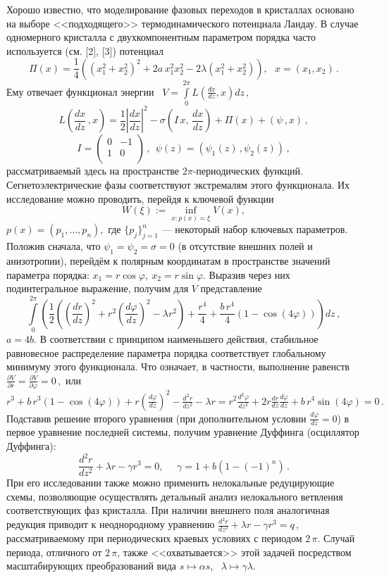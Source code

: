 Хорошо известно, что моделирование фазовых переходов в кристаллах
основано на выборе <<подходящего>> термодинамического потенциала
Ландау. В случае одномерного кристалла с двухкомпонентным параметром
порядка часто используется (см. [2], [3]) потенциал
 $$
\Pi(x) = \frac14 \left((x_1^2+x_2^2)^2+ 2a\,x_1^2x_2^2 -
2\lambda(x_1^2+x_2^2)\right), \ \ \  x =(x_1,x_2)\,.
 $$
Ему отвечает функционал энергии  \ $V =
\int\limits_0^{2\pi}L(\frac{d x}{d z},x)dz\,,$
 $$
L\left(\frac{d x}{d z}\,,x\right) = \frac12 \left|\frac{d x}{d
z}\right|^2- \sigma\left(I\,x,\,\frac{d x}{d z}\right) + \Pi(x) +
(\psi\,, x)\,,
 $$
 $$
I= \left(
    \begin{array}{cc}
    0 &- 1\\
   1 &  0\\
    \end{array}
    \right)\,,
\ \ \psi(z) =(\psi_1(z)\,, \psi_2(z))\,,
 $$
рассматриваемый здесь на пространстве $2\pi$-периодических функций.
Сегнетоэлектрические фазы соответствуют экстремалям этого
функционала. Их исследование можно проводить, перейдя к ключевой
функции
 $$
W(\xi):=\inf_{x:p(x)=\xi} V(x),
 $$
$p(x)=(p_1,\dots,p_n),$ где $\{p_j\}_{j=1}^n$ --- некоторый набор
ключевых параметров. Положив сначала, что $\psi_1 = \psi_2 =\sigma =
0$ (в отсутствие внешних полей и анизотропии), перейдём к полярным
координатам в пространстве значений параметра порядка:
 $
x_1=r\cos\varphi,\ x_2=r\sin\varphi.
 $
Выразив через них подинтегральное выражение, получим для $V$
представление
 {\footnotesize
 $$
\int\limits_0^{2\pi} \left(\frac12\left(\left(\frac{d r}{d
z}\right)^2 + r^2\left(\frac{d \varphi}{d z}\right)^2-\lambda r^2
\right) + \frac{r^4}4 +\frac{b\,r^4}4(1-\cos( 4\varphi))\right)dz\,,
 $$}
$a=4b$. В соответствии с принципом наименьшего действия, стабильное
равновесное распределение параметра порядка соответствует
глобальному минимуму этого функ\-ци\-о\-на\-ла. Что означает, в
частности, выполнение равенств
 $
\frac{\partial V}{\partial r}= \frac{\partial V}{\partial \varphi}=0
\,,
 $
или
 $
r^3 + b\,r^3(1-\cos (4\varphi)) + r\left(\frac{d \varphi}{d
z}\right)^2-\frac{d^2 r}{d z^2} -\lambda r = r^2\frac{d^2\varphi}{d
z^2} + 2r\frac{d r}{d z}\frac{d \varphi}{d z} + b\,r^4\sin(
4\varphi) = 0\,.
 $
Подставив решение второго уравнения (при дополнительном условии $
\frac{d \varphi}{d z}=0$) в первое уравнение последней системы,
получим уравнение Дуффинга (осциллятор Дуффинга):
 $$
 \frac{d^2 r}{d z^2} + \lambda r - \gamma  r^3=0, \
 \ \ \ \ \  \gamma = 1+b\left(1-(-1)^n\right)\,.
 $$
При его исследовании также можно применить нелокальные редуцирующие
схемы, позволяющие осуществлять детальный анализ нелокального
ветвления соответствующих фаз кристалла. При наличии внешнего поля
аналогичная редукция приводит к неоднородному уравнению
 $
\frac{d^2 r}{d z^2} + \lambda r - \gamma r^3=q\,,
 $
рассматриваемому при периодических краевых условиях с периодом
$2\,\pi$. Случай периода, отличного от $2\,\pi$, также
<<охватывается>> этой задачей посредством масштабирующих
преобразований вида $s\longmapsto \alpha s$, \ $\lambda\longmapsto
\gamma \lambda$.

